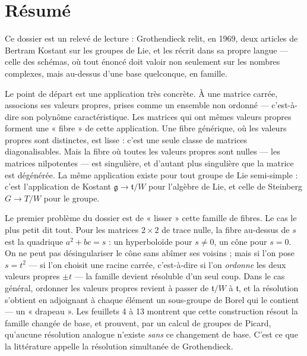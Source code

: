 \documentclass[11pt,a4paper]{article}
\begin{document}
\section*{Résumé}

\begin{resume}
Ce dossier est un relevé de lecture : Grothendieck relit, en 1969, deux
articles de Bertram Kostant sur les groupes de Lie, et les récrit dans sa propre
langue — celle des schémas, où tout énoncé doit valoir non seulement sur les
nombres complexes, mais au-dessus d'une base quelconque, en famille.

Le point de départ est une application très concrète. À une matrice carrée,
associons ses valeurs propres, prises comme un ensemble non ordonné —
c'est-à-dire son polynôme caractéristique. Les matrices qui ont mêmes valeurs
propres forment une « fibre » de cette application. Une fibre générique, où les
valeurs propres sont distinctes, est lisse : c'est une seule classe de matrices
diagonalisables. Mais la fibre où toutes les valeurs propres sont nulles —
les matrices nilpotentes — est singulière, et d'autant plus singulière que la
matrice est dégénérée. La même application existe pour tout groupe de Lie
semi-simple : c'est l'application de Kostant $\mathfrak{g}\to\mathfrak{t}/W$
pour l'algèbre de Lie, et celle de Steinberg $G\to T/W$ pour le groupe.

Le premier problème du dossier est de « lisser » cette famille de fibres. Le
cas le plus petit dit tout. Pour les matrices $2\times 2$ de trace nulle, la
fibre au-dessus de $s$ est la quadrique $a^{2}+bc=s$ : un hyperboloïde pour
$s\neq 0$, un cône pour $s=0$. On ne peut pas désingulariser le cône sans
abîmer ses voisins ; mais si l'on pose $s=t^{2}$ — si l'on choisit une racine
carrée, c'est-à-dire si l'on \emph{ordonne} les deux valeurs propres $\pm t$ —
la famille devient résoluble d'un seul coup. Dans le cas général, ordonner les
valeurs propres revient à passer de $\mathfrak{t}/W$ à $\mathfrak{t}$, et la
résolution s'obtient en adjoignant à chaque élément un sous-groupe de Borel qui
le contient — un « drapeau ». Les feuillets 4 à 13 montrent que cette
construction résout la famille changée de base, et prouvent, par un calcul de
groupes de Picard, qu'aucune résolution analogue n'existe \emph{sans} ce
changement de base. C'est ce que la littérature appelle la résolution simultanée
de Grothendieck.


\end{resume}
\end{document}

